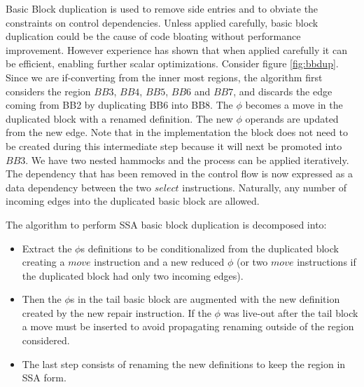 Basic Block duplication is used to remove side entries and to obviate the constraints on control dependencies. Unless applied carefully, basic block duplication could be the cause of code bloating without performance improvement. However experience has shown that when applied carefully it can be efficient, enabling further scalar optimizations.
Consider figure \ref{fig:bbdup}. Since we are if-converting from the inner most regions, the algorithm first considers the region $BB3$, $BB4$, $BB5$, $BB6$ and $BB7$, and discards the edge coming from BB2 by duplicating BB6 into BB8. The $\phi$ becomes a move in the duplicated block with a renamed definition. The new $\phi$ operands are updated from the new edge. Note that in the implementation the block does not need to be created during this intermediate step because it will next be promoted into $BB3$. We have two nested hammocks and the process can be applied iteratively. The dependency that has been removed in the control flow is now expressed as a data dependency between the two $select$ instructions.
Naturally, any number of incoming edges into the duplicated basic block are allowed.

The algorithm to perform SSA basic block duplication is decomposed into:
\begin{itemize}
\item Extract the $\phi$s definitions to be conditionalized from the duplicated block creating a $move$ instruction and a new reduced $\phi$ (or two $move$ instructions if the duplicated block had only two incoming edges).
\item Then the $\phi$s in the tail basic block are augmented with the new definition created by the new repair instruction. If the $\phi$ was live-out after the tail block a move must be inserted to avoid propagating renaming outside of the region considered. 
\item The last step consists of renaming the new definitions to keep the region in SSA form.
\end{itemize}

